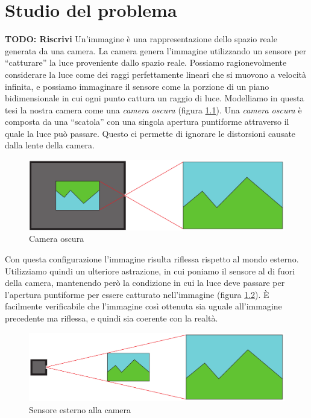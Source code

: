 \chapter{Studio del problema}
\label{sec:prospettiva}

\textbf{TODO: Riscrivi}
Un'immagine è una rappresentazione dello spazio reale generata da una camera.
La camera genera l'immagine utilizzando un sensore per ``catturare'' la luce proveniente dallo spazio reale. 
Possiamo ragionevolmente considerare la luce come dei raggi perfettamente lineari che si muovono a velocità infinita, e possiamo immaginare il sensore come la porzione di un piano bidimensionale in cui ogni punto cattura un raggio di luce.
Modelliamo in questa tesi la nostra camera come una \emph{camera oscura} (figura \ref{fig:camera oscura}).
Una \emph{camera oscura} è composta da una ``scatola'' con una singola apertura puntiforme attraverso il quale la luce può passare.
Questo ci permette di ignorare le distorsioni causate dalla lente della camera.
\begin{figure}
    \caption{Camera oscura}
    \label{fig:camera oscura}
    \centering
    \includegraphics[width=\textwidth]{images/camera oscura.pdf}
\end{figure}

Con questa configurazione l'immagine risulta riflessa rispetto al mondo esterno.
Utilizziamo quindi un ulteriore astrazione, in cui poniamo il sensore al di fuori della camera, mantenendo però la condizione in cui la luce deve passare per l'apertura puntiforme per essere catturato nell'immagine (figura \ref{fig:camera model}).
È facilmente verificabile che l'immagine così ottenuta sia uguale all'immagine precedente ma riflessa, e quindi sia coerente con la realtà.
\begin{figure}
    \caption{Sensore esterno alla camera}
    \label{fig:camera model}
    \centering
    \includegraphics[width=\textwidth]{images/camera astratta.pdf}
\end{figure}

